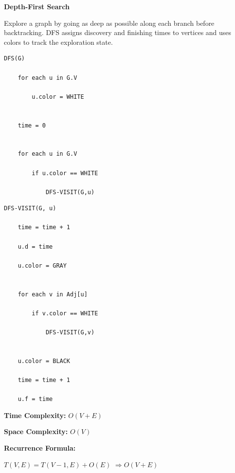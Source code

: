\documentclass[a4paper,12pt]{article}
\begin{document}
\begin{tcolorbox}[
    colback=gray!30,
    colframe=black,
    boxrule=1pt,
    arc=0mm
]

\begin{tcolorbox}[
    colback=gray!10,
    colframe=black,
    arc=0mm
]
\centering
{\Huge\bfseries Depth-First Search}
\end{tcolorbox}


\begin{tcolorbox}[
    colback=gray!10,
    colframe=black,
    arc=0mm
]
\small
Explore a graph by going as deep as possible along each branch before
backtracking. DFS assigns discovery and finishing times to vertices and
uses colors to track the exploration state.
\end{tcolorbox}


\begin{tcolorbox}[
    colback=black!5,
    colframe=black,
    arc=0mm,
    title=Pseudo-code
]
\tiny
\begin{lstlisting}
DFS(G)

    for each u in G.V

        u.color = WHITE


    time = 0


    for each u in G.V

        if u.color == WHITE

            DFS-VISIT(G,u)
\end{lstlisting}


\begin{lstlisting}
DFS-VISIT(G, u)

    time = time + 1

    u.d = time

    u.color = GRAY


    for each v in Adj[u]

        if v.color == WHITE

            DFS-VISIT(G,v)


    u.color = BLACK

    time = time + 1

    u.f = time
\end{lstlisting}
\end{tcolorbox}


\begin{tcolorbox}[
    colback=cyan!20,
    colframe=black,
    arc=0mm
]
\small
\textbf{Time Complexity:}
$O(V+E)$
\end{tcolorbox}


\begin{tcolorbox}[
    colback=violet!20,
    colframe=black,
    arc=0mm
]
\small
\textbf{Space Complexity:}
$O(V)$
\end{tcolorbox}


\begin{tcolorbox}[
    colback=pink!20,
    colframe=black,
    arc=0mm
]
\small
\textbf{Recurrence Formula:}

$T(V,E)=T(V-1,E)+O(E)$
$\Rightarrow O(V+E)$
\end{tcolorbox}

\end{tcolorbox}
\end{document}
